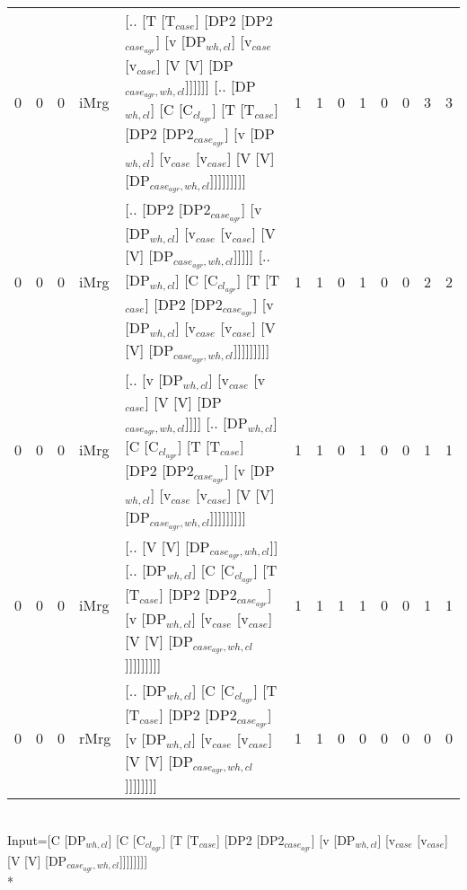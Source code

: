 \begin{tabularx}{\linewidth}{rrrlXrrrrrrrr}
   0 &       0 &   0 & iMrg & [.. [T [T$_{case}$] [DP2 [DP2$_{case_{agr}}$] [v [DP$_{wh,cl}$] [v$_{case}$ [v$_{case}$] [V [V] [DP$_{case_{agr},wh,cl}$]]]]]] [.. [DP$_{wh,cl}$] [C [C$_{cl_{agr}}$] [T [T$_{case}$] [DP2 [DP2$_{case_{agr}}$] [v [DP$_{wh,cl}$] [v$_{case}$ [v$_{case}$] [V [V] [DP$_{case_{agr},wh,cl}$]]]]]]]]]                &             1 &             1 &                  0 &            1 &               0 &             0 &        3 &        3 \\
   0 &       0 &   0 & iMrg & [.. [DP2 [DP2$_{case_{agr}}$] [v [DP$_{wh,cl}$] [v$_{case}$ [v$_{case}$] [V [V] [DP$_{case_{agr},wh,cl}$]]]]] [.. [DP$_{wh,cl}$] [C [C$_{cl_{agr}}$] [T [T$_{case}$] [DP2 [DP2$_{case_{agr}}$] [v [DP$_{wh,cl}$] [v$_{case}$ [v$_{case}$] [V [V] [DP$_{case_{agr},wh,cl}$]]]]]]]]]                             &             1 &             1 &                  0 &            1 &               0 &             0 &        2 &        2 \\
   0 &       0 &   0 & iMrg & [.. [v [DP$_{wh,cl}$] [v$_{case}$ [v$_{case}$] [V [V] [DP$_{case_{agr},wh,cl}$]]]] [.. [DP$_{wh,cl}$] [C [C$_{cl_{agr}}$] [T [T$_{case}$] [DP2 [DP2$_{case_{agr}}$] [v [DP$_{wh,cl}$] [v$_{case}$ [v$_{case}$] [V [V] [DP$_{case_{agr},wh,cl}$]]]]]]]]]                                                  &             1 &             1 &                  0 &            1 &               0 &             0 &        1 &        1 \\
   0 &       0 &   0 & iMrg & [.. [V [V] [DP$_{case_{agr},wh,cl}$]] [.. [DP$_{wh,cl}$] [C [C$_{cl_{agr}}$] [T [T$_{case}$] [DP2 [DP2$_{case_{agr}}$] [v [DP$_{wh,cl}$] [v$_{case}$ [v$_{case}$] [V [V] [DP$_{case_{agr},wh,cl}$]]]]]]]]]                                                                                   &             1 &             1 &                  1 &            1 &               0 &             0 &        1 &        1 \\
   0 &       0 &   0 & rMrg & [.. [DP$_{wh,cl}$] [C [C$_{cl_{agr}}$] [T [T$_{case}$] [DP2 [DP2$_{case_{agr}}$] [v [DP$_{wh,cl}$] [v$_{case}$ [v$_{case}$] [V [V] [DP$_{case_{agr},wh,cl}$]]]]]]]]                                                                                                                    &             1 &             1 &                  0 &            0 &               0 &             0 &        0 &        0 \\
\hline
\end{tabularx}\endgroup\\
\begingroup\scriptsize Input=[C [DP$_{wh,cl}$] [C [C$_{cl_{agr}}$] [T [T$_{case}$] [DP2 [DP2$_{case_{agr}}$] [v [DP$_{wh,cl}$] [v$_{case}$ [v$_{case}$] [V [V] [DP$_{case_{agr},wh,cl}$]]]]]]]]\\*
